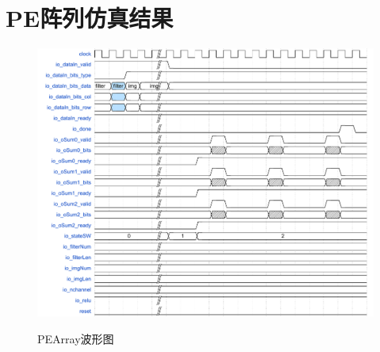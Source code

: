\section{PE阵列仿真结果}
\begin{figure}[h]
    \centering
    \includegraphics[scale=0.65]{../pdf/pearray_w.pdf}\\
    \caption{PEArray波形图}
\end{figure}


